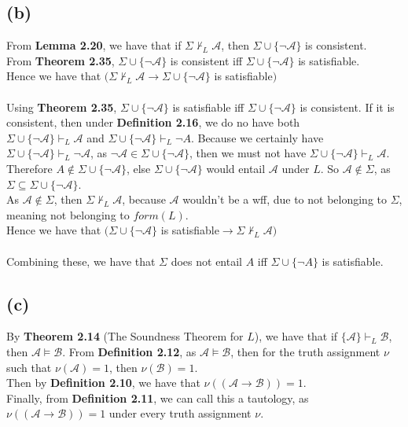 \documentclass[11pt,oneside,a4paper]{article}
\begin{document}
\subsection*{(b)}
From \textbf{Lemma 2.20}, we have that if $\Sigma \nvdash_L \mathcal{A}$, then $\Sigma  \cup \{ \neg \mathcal{A} \}$ is consistent.\\
From \textbf{Theorem 2.35}, $\Sigma  \cup \{ \neg \mathcal{A} \}$ is consistent iff $\Sigma  \cup \{ \neg \mathcal{A} \}$ is satisfiable.\\
Hence we have that $(\Sigma \nvdash_L \mathcal{A} \to \Sigma  \cup \{ \neg \mathcal{A} \}$ is satisfiable$)$\\
\\
Using \textbf{Theorem 2.35}, $\Sigma  \cup \{ \neg \mathcal{A} \}$ is satisfiable iff $\Sigma  \cup \{ \neg \mathcal{A} \}$ is consistent. If it is consistent, then under \textbf{Definition 2.16}, we do no have both \\$\Sigma \cup \{ \neg \mathcal{A} \} \vdash_L \mathcal{A}$ and $\Sigma  \cup \{ \neg \mathcal{A} \} \vdash_L \neg A$. Because we certainly have \\$\Sigma  \cup \{ \neg \mathcal{A} \} \vdash_L \neg \mathcal{A}$, as $\neg \mathcal{A} \in \Sigma  \cup \{ \neg \mathcal{A} \}$, then we must not have $\Sigma  \cup \{ \neg \mathcal{A} \} \vdash_L \mathcal{A}$.\\
Therefore $ A \notin \Sigma  \cup \{ \neg \mathcal{A} \}$, else $\Sigma  \cup \{ \neg \mathcal{A} \}$ would entail  $\mathcal{A}$ under $L$. So $\mathcal{A} \notin \Sigma$, as $\Sigma \subseteq \Sigma  \cup \{ \neg \mathcal{A} \}$.\\
As $\mathcal{A} \notin \Sigma$, then $\Sigma \nvdash_L \mathcal{A}$, because $\mathcal{A}$ wouldn't be a wff, due to not belonging to $\Sigma$, meaning not belonging to $form(L)$.\\
Hence we have that $(\Sigma  \cup \{ \neg \mathcal{A} \}$ is satisfiable$\to \Sigma \nvdash_L \mathcal{A})$\\
\\
Combining these, we have that $\Sigma$ does not entail $A$ iff $\Sigma  \cup \{ \neg A \}$ is satisfiable.

\subsection*{(c)}
By \textbf{Theorem 2.14} (The Soundness Theorem for $L$), we have that if $\{ \mathcal{A} \} \vdash_L \mathcal{B}$, then $\mathcal{A} \vDash \mathcal{B}$. From \textbf{Definition 2.12}, as $\mathcal{A} \vDash \mathcal{B}$, then for the truth assignment $\nu$ such that $\nu (\mathcal{A})=1$, then $\nu (\mathcal{B})=1$.\\
Then by \textbf{Definition 2.10}, we have that $\nu ((\mathcal{A} \to \mathcal{B})) = 1$.\\
Finally, from \textbf{Definition 2.11}, we can call this a tautology, as\\ $\nu ((\mathcal{A} \to \mathcal{B})) = 1$ under every truth assignment $\nu$.
\end{document}

